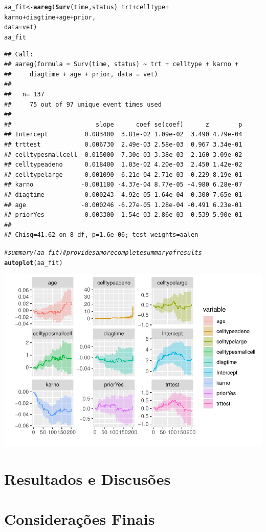 \documentclass[a4paper, oneside]{book}\usepackage[]{graphicx}\usepackage[]{color}
\makeatletter
\def\maxwidth{ %
  \ifdim\Gin@nat@width>\linewidth
    \linewidth
  \else
    \Gin@nat@width
  \fi
}
\newcommand{\hlcom}[1]{\textcolor[rgb]{0.678,0.584,0.686}{\textit{#1}}}%
\newcommand{\hlopt}[1]{\textcolor[rgb]{0,0,0}{#1}}%
\newcommand{\hlstd}[1]{\textcolor[rgb]{0.345,0.345,0.345}{#1}}%
\newcommand{\hlkwb}[1]{\textcolor[rgb]{0.69,0.353,0.396}{#1}}%
\newcommand{\hlkwc}[1]{\textcolor[rgb]{0.333,0.667,0.333}{#1}}%
\newcommand{\hlkwd}[1]{\textcolor[rgb]{0.737,0.353,0.396}{\textbf{#1}}}%
\newenvironment{kframe}{%
 \def\at@end@of@kframe{}%
 \ifinner\ifhmode%
  \def\at@end@of@kframe{\end{minipage}}%
  \begin{minipage}{\columnwidth}%
 \fi\fi%
 \def\FrameCommand##1{\hskip\@totalleftmargin \hskip-\fboxsep
 \colorbox{shadecolor}{##1}\hskip-\fboxsep
     \hskip-\linewidth \hskip-\@totalleftmargin \hskip\columnwidth}%
 \MakeFramed {\advance\hsize-\width
   \@totalleftmargin\z@ \linewidth\hsize
   \@setminipage}}%
 {\par\unskip\endMakeFramed%
 \at@end@of@kframe}
\newenvironment{knitrout}{}{} %
\makeatother
\begin{document}
\begin{knitrout}
\color{fgcolor}\begin{kframe}
\begin{alltt}
\hlstd{aa_fit} \hlkwb{<-}\hlkwd{aareg}\hlstd{(}\hlkwd{Surv}\hlstd{(time, status)} \hlopt{~} \hlstd{trt} \hlopt{+} \hlstd{celltype} \hlopt{+}
                 \hlstd{karno} \hlopt{+} \hlstd{diagtime} \hlopt{+} \hlstd{age} \hlopt{+} \hlstd{prior ,}
                 \hlkwc{data} \hlstd{= vet)}
\hlstd{aa_fit}
\end{alltt}
\begin{verbatim}
## Call:
## aareg(formula = Surv(time, status) ~ trt + celltype + karno + 
##     diagtime + age + prior, data = vet)
## 
##   n= 137 
##     75 out of 97 unique event times used
## 
##                       slope      coef se(coef)      z        p
## Intercept          0.083400  3.81e-02 1.09e-02  3.490 4.79e-04
## trttest            0.006730  2.49e-03 2.58e-03  0.967 3.34e-01
## celltypesmallcell  0.015000  7.30e-03 3.38e-03  2.160 3.09e-02
## celltypeadeno      0.018400  1.03e-02 4.20e-03  2.450 1.42e-02
## celltypelarge     -0.001090 -6.21e-04 2.71e-03 -0.229 8.19e-01
## karno             -0.001180 -4.37e-04 8.77e-05 -4.980 6.28e-07
## diagtime          -0.000243 -4.92e-05 1.64e-04 -0.300 7.65e-01
## age               -0.000246 -6.27e-05 1.28e-04 -0.491 6.23e-01
## priorYes           0.003300  1.54e-03 2.86e-03  0.539 5.90e-01
## 
## Chisq=41.62 on 8 df, p=1.6e-06; test weights=aalen
\end{verbatim}
\begin{alltt}
\hlcom{#summary(aa_fit)  # provides a more complete summary of results}
\hlkwd{autoplot}\hlstd{(aa_fit)}
\end{alltt}
\end{kframe}

{\centering \includegraphics[width=\maxwidth]{figure/script7-1} 

}



\end{knitrout}


      
  \chapter{Resultados e Discusões}

  
  
  
  \chapter{Considerações Finais}
  
  


\end{document}
